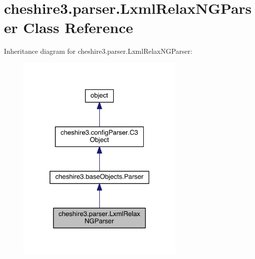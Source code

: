 \hypertarget{classcheshire3_1_1parser_1_1_lxml_relax_n_g_parser}{\section{cheshire3.\-parser.\-Lxml\-Relax\-N\-G\-Parser Class Reference}
\label{classcheshire3_1_1parser_1_1_lxml_relax_n_g_parser}
}


Inheritance diagram for cheshire3.\-parser.\-Lxml\-Relax\-N\-G\-Parser\-:
\nopagebreak
\begin{figure}[H]
\begin{center}
\leavevmode
\includegraphics[width=230pt]{classcheshire3_1_1parser_1_1_lxml_relax_n_g_parser__inherit__graph}
\end{center}
\end{figure}


